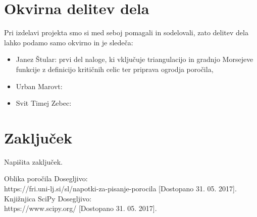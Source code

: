 \documentclass{article}
\begin{document}
\section{Okvirna delitev dela}
Pri izdelavi projekta smo si med seboj pomagali in sodelovali, zato delitev dela lahko podamo samo okvirno in je sledeča:
\begin{itemize}
    \item Janez Štular: prvi del naloge, ki vključuje triangulacijo in gradnjo Morsejeve funkcije z definicijo kritičnih celic ter priprava ogrodja poročila,
    \item Urban Marovt:
    \item Svit Timej Zebec:
\end{itemize}

\section{Zaključek}
Napišita zaključek.

\begin{thebibliography}{99}
 Oblika poročila
        Dosegljivo:\\ https://fri.uni-lj.si/sl/napotki-za-pisanje-porocila [Dostopano 31. 05. 2017].
 Knjižnjica SciPy
        Dosegljivo:\\ https://www.scipy.org/ [Dostopano 31. 05. 2017].
        

\end{thebibliography}
\end{document}
